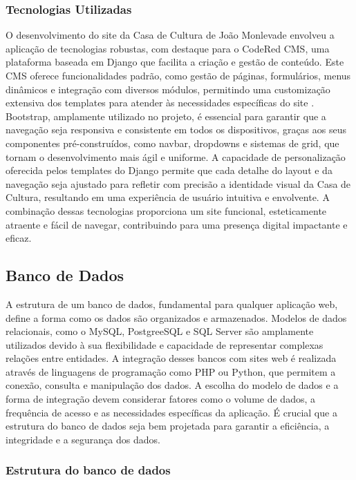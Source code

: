 \subsubsection{Tecnologias Utilizadas}

O desenvolvimento do site da Casa de Cultura de João Monlevade envolveu a aplicação de tecnologias robustas, com destaque para o CodeRed CMS, uma plataforma baseada em Django que facilita a criação e gestão de conteúdo. Este CMS oferece funcionalidades padrão, como gestão de páginas, formulários, menus dinâmicos e integração com diversos módulos, permitindo uma customização extensiva dos templates para atender às necessidades específicas do site \cite{ellis2015coders}. Bootstrap, amplamente utilizado no projeto, é essencial para garantir que a navegação seja responsiva e consistente em todos os dispositivos, graças aos seus componentes pré-construídos, como navbar, dropdowns e sistemas de grid, que tornam o desenvolvimento mais ágil e uniforme. A capacidade de personalização oferecida pelos templates do Django permite que cada detalhe do layout e da navegação seja ajustado para refletir com precisão a identidade visual da Casa de Cultura, resultando em uma experiência de usuário intuitiva e envolvente. A combinação dessas tecnologias proporciona um site funcional, esteticamente atraente e fácil de navegar, contribuindo para uma presença digital impactante e eficaz.


\subsection{Banco de Dados}

A estrutura de um banco de dados, fundamental para qualquer aplicação web, define a forma como os dados são organizados e armazenados. Modelos de dados relacionais, como o MySQL, PostgreeSQL e SQL Server são amplamente utilizados devido à sua flexibilidade e capacidade de representar complexas relações entre entidades. A integração desses bancos com sites web é realizada através de linguagens de programação como PHP ou Python, que permitem a conexão, consulta e manipulação dos dados. A escolha do modelo de dados e a forma de integração devem considerar fatores como o volume de dados, a frequência de acesso e as necessidades específicas da aplicação. É crucial que a estrutura do banco de dados seja bem projetada para garantir a eficiência, a integridade e a segurança dos dados.

\subsubsection{Estrutura do banco de dados}

